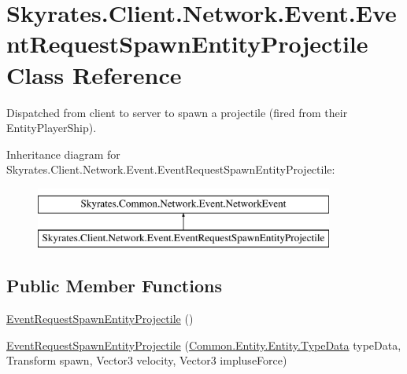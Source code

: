 \hypertarget{class_skyrates_1_1_client_1_1_network_1_1_event_1_1_event_request_spawn_entity_projectile}{\section{Skyrates.\-Client.\-Network.\-Event.\-Event\-Request\-Spawn\-Entity\-Projectile Class Reference}
\label{class_skyrates_1_1_client_1_1_network_1_1_event_1_1_event_request_spawn_entity_projectile}
}


Dispatched from client to server to spawn a projectile (fired from their Entity\-Player\-Ship).  


Inheritance diagram for Skyrates.\-Client.\-Network.\-Event.\-Event\-Request\-Spawn\-Entity\-Projectile\-:\begin{figure}[H]
\begin{center}
\leavevmode
\includegraphics[height=2.000000cm]{class_skyrates_1_1_client_1_1_network_1_1_event_1_1_event_request_spawn_entity_projectile}
\end{center}
\end{figure}
\subsection*{Public Member Functions}
\begin{DoxyCompactItemize}
\item 
\hyperlink{class_skyrates_1_1_client_1_1_network_1_1_event_1_1_event_request_spawn_entity_projectile_a9ceba7ad069eb80bae2debef38d84339}{Event\-Request\-Spawn\-Entity\-Projectile} ()
\item 
\hyperlink{class_skyrates_1_1_client_1_1_network_1_1_event_1_1_event_request_spawn_entity_projectile_a2768cd31f2a853622f13683aeabfc631}{Event\-Request\-Spawn\-Entity\-Projectile} (\hyperlink{class_skyrates_1_1_common_1_1_entity_1_1_entity_1_1_type_data}{Common.\-Entity.\-Entity.\-Type\-Data} type\-Data, Transform spawn, Vector3 velocity, Vector3 impluse\-Force)
\end{DoxyCompactItemize}
